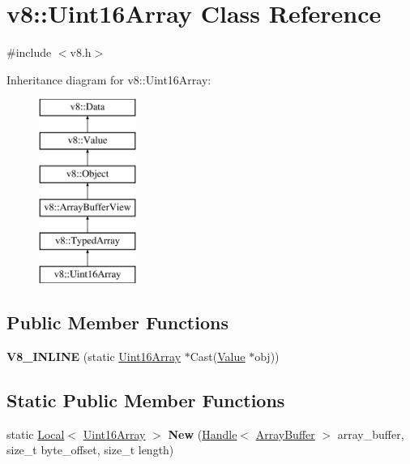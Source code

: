 \hypertarget{classv8_1_1_uint16_array}{}\section{v8\+:\+:Uint16\+Array Class Reference}
\label{classv8_1_1_uint16_array}


{\ttfamily \#include $<$v8.\+h$>$}

Inheritance diagram for v8\+:\+:Uint16\+Array\+:\begin{figure}[H]
\begin{center}
\leavevmode
\includegraphics[height=6.000000cm]{classv8_1_1_uint16_array}
\end{center}
\end{figure}
\subsection*{Public Member Functions}
\begin{DoxyCompactItemize}
\item 
\hypertarget{classv8_1_1_uint16_array_ac8d8dc35bacaf31b59305ce56321de0c}{}{\bfseries V8\+\_\+\+I\+N\+L\+I\+N\+E} (static \hyperlink{classv8_1_1_uint16_array}{Uint16\+Array} $\ast$Cast(\hyperlink{classv8_1_1_value}{Value} $\ast$obj))\label{classv8_1_1_uint16_array_ac8d8dc35bacaf31b59305ce56321de0c}

\end{DoxyCompactItemize}
\subsection*{Static Public Member Functions}
\begin{DoxyCompactItemize}
\item 
\hypertarget{classv8_1_1_uint16_array_a61009e1e8ee6903da33cb95685910270}{}static \hyperlink{classv8_1_1_local}{Local}$<$ \hyperlink{classv8_1_1_uint16_array}{Uint16\+Array} $>$ {\bfseries New} (\hyperlink{classv8_1_1_handle}{Handle}$<$ \hyperlink{classv8_1_1_array_buffer}{Array\+Buffer} $>$ array\+\_\+buffer, size\+\_\+t byte\+\_\+offset, size\+\_\+t length)\label{classv8_1_1_uint16_array_a61009e1e8ee6903da33cb95685910270}

\end{DoxyCompactItemize}



